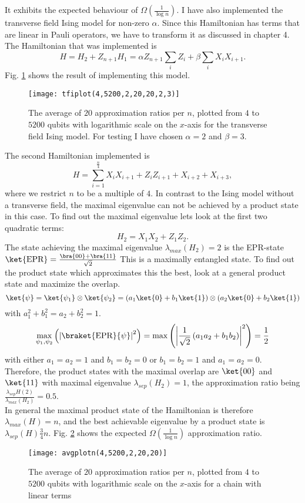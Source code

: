 It exhibits the expected behaviour of $\Omega(\frac{1}{\log{}n})$.
I have also implemented the transverse field Ising model for non-zero $\alpha$.
Since this Hamiltonian has terms that are linear in Pauli operators, we have to transform it as discussed in chapter 4.
The Hamiltonian that was implemented is \[
H = H_2 + Z_{n+1}H_1 =\alpha Z_{n+1}\sum_{i} Z_i + \beta \sum_{i} X_iX_{i+1}
.\]
Fig. \ref{fig:2} shows the result of implementing this model.
\begin{figure}[H]
	\centering
	\texttt{[image: tfiplot(4,5200,2,20,20,2,3)]}
	\caption{The average of $20$ approximation ratios per $n$, plotted from $4$ to $5200$ qubits with logarithmic scale on the $x$-axis for the transverse field Ising model. For testing I have chosen $\alpha=2$ and $\beta=3$.}
	\label{fig:2}
\end{figure}
The second Hamiltonian implemented is \[
	H = \sum_{i=1}^{\frac{n}{4}} X_iX_{i+1}+Z_iZ_{i+1}+X_{i+2}+X_{i+3},
\]
where we restrict $n$ to be a multiple of $4$. 
In contrast to the Ising model without a transverse field, the maximal eigenvalue can not be achieved by a product state in this case.
To find out the maximal eigenvalue lets look at the first two quadratic terms:
\[
H_2=X_1X_2+Z_1Z_2
.\]
The state achieving the maximal eigenvalue $\lambda_{max}(H_2)=2$ is the EPR-state $\ket{\text{EPR}}=\frac{\bra{00}+\bra{11}}{\sqrt{2}}$
This is a maximally entangled state.
To find out the product state which approximates this the best, look at a general product state and maximize the overlap.
\[
	\ket{\psi}=\ket{\psi_1}\otimes\ket{\psi_2}=\left(a_1\ket{0}+b_1\ket{1}\right)\otimes\left(a_2\ket{0}+b_2\ket{1}\right)
\] with $a_1^2+b_1^2=a_2+b_2^2=1$.
\[
\max_{\psi_1,\psi_2}\left(\left|\braket{\text{EPR}}{\psi}\right|^2\right)=\max\left(\left|\frac{1}{\sqrt{2}}\left(a_1a_2+b_1b_2\right)\right|^2\right)=\frac{1}{2}
\]
with either $a_1=a_2=1$ and $b_1=b_2=0$ or $b_1=b_2=1$ and $a_1=a_2=0$.
Therefore, the product states with the maximal overlap are $\ket{00}$ and $\ket{11}$ with maximal eigenvalue $\lambda_{sep}(H_2)=1$, the approximation ratio being  $\frac{\lambda_{sep}H(2)}{\lambda_{max}(H_2)} = 0.5$.\\
In general the maximal product state of the Hamiltonian is therefore $\lambda_{max}(H)=n$, and the best achievable eigenvalue by a product state is $\lambda_{sep}(H)\frac{3}{4}n$.
Fig. \ref{fig:3} shows the expected $\Omega\left( \frac{1}{\log{}n} \right) $ approximation ratio.
\begin{figure}[H]
	\centering
	\texttt{[image: avgplotn(4,5200,2,20,20)]}
	\caption{The average of $20$ approximation ratios per $n$, plotted from $4$ to $5200$ qubits with logarithmic scale on the $x$-axis for a chain with linear terms}
	\label{fig:3}
\end{figure}
